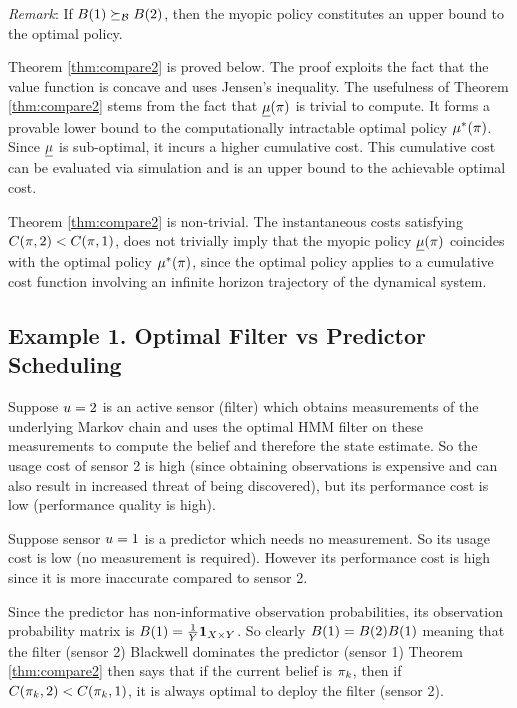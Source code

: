 \documentclass[draftcls,onecolumn]{IEEEtran}
\begin{document}
{\em Remark}: If  $B(1) \succeq_{\mathcal{B}} B(2)  $, then the myopic policy constitutes an upper bound to the optimal policy.

Theorem \ref{thm:compare2} is proved below.
 The proof exploits the fact that the value function is concave  and uses Jensen's inequality.
The usefulness of Theorem \ref{thm:compare2} stems from the fact that $\underline{\mu}(\pi)$ is trivial to compute. It  forms a provable
lower bound to the computationally intractable optimal policy $\mu^*(\pi)$.  
Since $\underline{\mu}$ is sub-optimal, it incurs a higher   cumulative cost. This  cumulative cost can be evaluated via simulation and is
an upper bound to the achievable  optimal cost.


Theorem \ref{thm:compare2} is  non-trivial.
The instantaneous costs
satisfying $C(\pi,2) < C(\pi,1)$,  does not trivially  imply that the myopic policy 
$\underline{\mu}(\pi)$ coincides with the optimal policy $\mu^*(\pi)$, since the optimal policy applies to a cumulative cost function involving
an infinite horizon
 trajectory of the dynamical system.


\subsection{Example 1.  Optimal Filter  vs Predictor Scheduling}  
Suppose $u=2$ is an active sensor  (filter) which obtains measurements of the underlying Markov chain and uses the optimal HMM  filter
on these measurements to compute the belief and therefore
the state estimate.
 So the usage cost of sensor 2 is high (since obtaining observations is expensive and can also result in increased threat of being discovered), but its performance cost is
low (performance quality is high). 

Suppose  sensor $u=1$ is a predictor which needs no measurement. So its usage cost  is low (no measurement is required).
However its performance cost is high since it is more inaccurate compared to sensor 2.

Since the predictor has non-informative observation probabilities, its observation probability matrix is $B(1) = 
\frac{1}{{Y}}\mathbf{1}_{X \times {Y}}$. So clearly
$B(1) = B(2)  B(1) $
meaning that the filter (sensor 2)  Blackwell dominates the predictor (sensor 1)
Theorem \ref{thm:compare2} then says that if the current belief is $\pi_k$, then if  $C(\pi_k,2) < C(\pi_k,1)$, it is always
optimal to deploy the filter (sensor 2).
\end{document}
